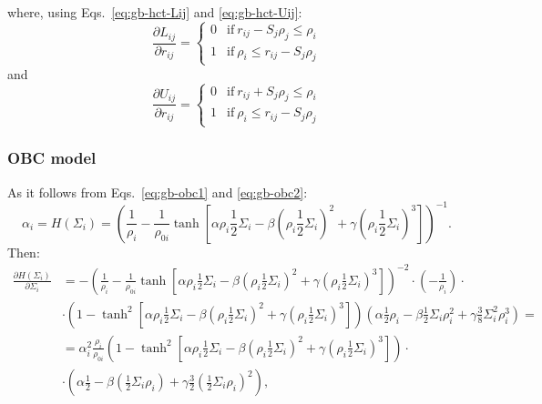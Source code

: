 \documentclass[11pt]{book}
\begin{document}
where, using Eqs.~\ref{eq:gb-hct-Lij} and \ref{eq:gb-hct-Uij}:
\begin{equation}\label{eq:gb-hct-dLij}
\frac{\partial L_{ij}}{\partial r_{ij}}=
\begin{cases}
0 &\mathrm{if~} r_{ij}-S_{j}\rho_{j}\le\rho_{i}\\
1 &\mathrm{if~} \rho_{i}\le r_{ij}-S_{j}\rho_{j}
\end{cases}
\end{equation}
and
\begin{equation}\label{eq:gb-hct-dUij}
\frac{\partial U_{ij}}{\partial r_{ij}}=
\begin{cases}
0 &\mathrm{if~} r_{ij}+S_{j}\rho_{j}\le\rho_{i}\\
1 &\mathrm{if~} \rho_{i}\le r_{ij}-S_{j}\rho_{j}
\end{cases}
\end{equation}


\subsubsection{OBC model}
As it follows from Eqs.~\ref{eq:gb-obc1} and \ref{eq:gb-obc2}:
\begin{equation}\label{eq:gb-obcalpha}
\alpha_{i}=H(\Sigma_{i})=\left(\frac{1}{\rho_{i}}-\frac{1}{\rho_{0i}}\tanh\left[\alpha\rho_{i}\frac{1}{2}\Sigma_{i}-\beta\left(\rho_{i}\frac{1}{2}\Sigma_{i}\right)^{2}+\gamma\left(\rho_{i}\frac{1}{2}\Sigma_{i}\right)^{3}\right]\right)^{-1}.
\end{equation}
Then:
\begin{equation}\label{eq:gb-obcdH}
\begin{split}
\frac{\partial H(\Sigma_{i})}{\partial \Sigma_{i}}&=-\left(\frac{1}{\rho_{i}}-\frac{1}{\rho_{0i}}\tanh\left[\alpha\rho_{i}\frac{1}{2}\Sigma_{i}-\beta\left(\rho_{i}\frac{1}{2}\Sigma_{i}\right)^{2}+\gamma\left(\rho_{i}\frac{1}{2}\Sigma_{i}\right)^{3}\right]\right)^{-2}\cdot\left(-\frac{1}{\rho_{i}}\right)\cdot\\
&\cdot\left(1-\tanh^{2}\left[\alpha\rho_{i}\frac{1}{2}\Sigma_{i}-\beta\left(\rho_{i}\frac{1}{2}\Sigma_{i}\right)^{2}+\gamma\left(\rho_{i}\frac{1}{2}\Sigma_{i}\right)^{3}\right]\right)\left(\alpha\frac{1}{2}\rho_{i}-\beta\frac{1}{2}\Sigma_{i}\rho_{i}^{2}+\gamma\frac{3}{8}\Sigma_{i}^{2}\rho_{i}^{3}\right)=\\
&=\alpha_{i}^{2}\frac{\rho_{i}}{\rho_{0i}}\left(1-\tanh^{2}\left[\alpha\rho_{i}\frac{1}{2}\Sigma_{i}-\beta\left(\rho_{i}\frac{1}{2}\Sigma_{i}\right)^{2}+\gamma\left(\rho_{i}\frac{1}{2}\Sigma_{i}\right)^{3}\right]\right)\cdot\\
&\cdot\left(\alpha\frac{1}{2}-\beta\left(\frac{1}{2}\Sigma_{i}\rho_{i}\right)+\gamma\frac{3}{2}\left(\frac{1}{2}\Sigma_{i}\rho_{i}\right)^{2}\right),
\end{split}
\end{equation}
\end{document}
